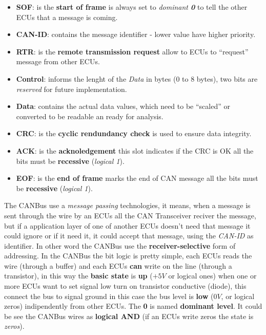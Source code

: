 \begin{itemize}[nosep]
    \item \textbf{SOF}: is the \textbf{start of frame} is always set to \textit{dominant \textbf{0}} to tell the other ECUs that a message is coming.
    \item \textbf{CAN-ID}: contains the message identifier - lower value have higher priority.
    \item \textbf{RTR}: is the \textbf{remote transmission request} allow to ECUs to ``request'' message from other ECUs.
    \item \textbf{Control}: informs the lenght of the \textit{Data} in bytes (0 to 8 bytes), two bits are \textit{reserved} for future implementation.
    \item \textbf{Data}: contains the actual data values, which need to be ``scaled'' or converted to be readable an ready for analysis.
    \item \textbf{CRC}: is the \textbf{cyclic rendundancy check} is used to ensure data integrity.
    \item \textbf{ACK}: is the \textbf{acknoledgement} this slot indicates if the CRC is OK all the bits must be \textbf{recessive} (\textit{logical 1}).
    \item \textbf{EOF}: is the \textbf{end of frame} marks the end of CAN message all the bits must be \textbf{recessive} (\textit{logical 1}).
\end{itemize}
The CANBus use a \textit{message passing} technologies, it means, when a message is sent through the wire by an ECUs all the CAN Transceiver reciver the message, but if a application layer of one of another ECUs doesn't need that message it could ignore or if it need it, it could accept that message, using the \textit{CAN-ID} as identifier. In other word the CANBus use the \textbf{receiver-selective} form of addressing. In the CANBus the bit logic is pretty simple, each ECUs reads the wire (through a buffer) and each ECUs \textbf{can} write on the line (through a transistor), in this way the \textbf{basic state} is \textbf{up} ($+5V$ or logical ones) when one or more ECUs want to set signal low turn on transistor conductive (diode), this connect the bus to signal ground in this case the bus level is \textbf{low} ($0V$, or logical zeros) indipendently from other ECUs. The \textbf{0} is named \textbf{dominant level}. It could be see the CANBus wires as \textbf{logical AND} (if an ECUs write zeros the state is \textit{zeros}). \\ \newline
